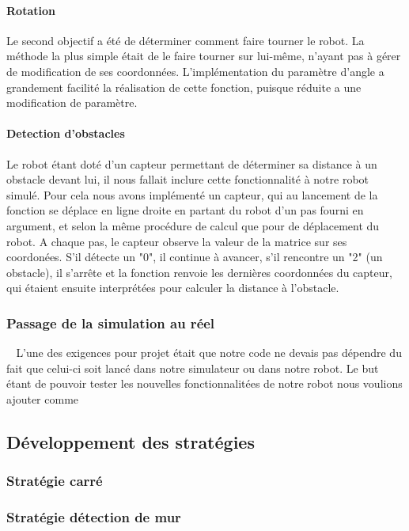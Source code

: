 \documentclass[12pt]{article}
\def\tab{$\>\>\>\>$}
\begin{document}
\paragraph{Rotation\\}
Le second objectif a été de déterminer comment faire tourner le robot. La méthode la plus simple était de le faire tourner sur lui-même, n'ayant pas à gérer de modification de ses coordonnées. L'implémentation du paramètre d'angle a grandement facilité la réalisation de cette fonction, puisque réduite a une modification de paramètre.
\paragraph{Detection d'obstacles\\}
Le robot étant doté d'un capteur permettant de déterminer sa distance à un obstacle devant lui, il nous fallait inclure cette fonctionnalité à notre robot simulé. Pour cela nous avons implémenté un capteur, qui au lancement de la fonction se déplace en ligne droite en partant du robot d'un pas fourni en argument, et selon la même procédure de calcul que pour de déplacement du robot. A chaque pas, le capteur observe la valeur de la matrice sur ses coordonées. S'il détecte un "0", il continue à avancer, s'il rencontre un "2" (un obstacle), il s'arrête et la fonction renvoie les dernières coordonnées du capteur, qui étaient ensuite interprétées pour calculer la distance à l'obstacle.    
\subsubsection{Passage de la simulation au réel}
\tab L'une des exigences pour projet était que notre code ne devais pas dépendre du fait que celui-ci soit lancé dans notre simulateur ou dans notre robot. Le but étant de pouvoir tester les nouvelles fonctionnalitées de notre robot nous voulions ajouter comme

\newpage
\subsection{Développement des stratégies}
\subsubsection{Stratégie carré}
\subsubsection{Stratégie détection de mur}
\end{document}
